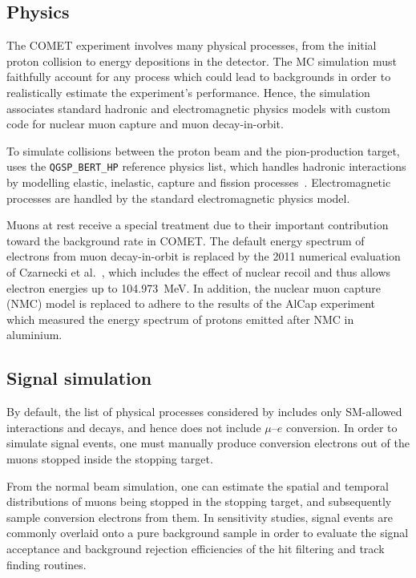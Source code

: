 
\subsection{Physics}
The COMET experiment involves many physical processes, from the initial proton
collision to energy depositions in the detector. The MC simulation must
faithfully account for any process which could lead to backgrounds in order to
realistically estimate the experiment's performance. Hence, the \SimG simulation
associates standard \Geant hadronic and electromagnetic physics models with
custom code for nuclear muon capture and muon decay-in-orbit.

To simulate collisions between the proton beam and the pion-production target,
\SimG uses the \texttt{QGSP\_BERT\_HP} reference physics list, which handles
hadronic interactions by modelling elastic, inelastic, capture and fission
processes~\cite{APOSTOLAKIS2009859}. Electromagnetic processes are handled by
the standard \Geant electromagnetic physics model.

Muons at rest receive a special treatment due to their important contribution
toward the background rate in COMET. The default energy spectrum of electrons
from muon decay-in-orbit is replaced by the 2011 numerical evaluation of
Czarnecki et al.~\cite{czarnecki}, which includes the effect of nuclear recoil
and thus allows electron energies up to \SI{104.973}{\MeV}. In addition, the
nuclear muon capture (NMC) model is replaced to adhere to the results of the
AlCap experiment~\cite{PhysRevC.105.035501} which measured the energy spectrum
of protons emitted after NMC in aluminium.




\subsection{Signal simulation}
By default, the list of physical processes considered by \SimG includes only
SM-allowed interactions and decays, and hence does not include $\mu$--$e$
conversion. In order to simulate signal events, one must manually produce
conversion electrons out of the muons stopped inside the stopping target.

From the normal beam simulation, one can estimate the spatial and temporal
distributions of muons being stopped in the stopping target, and subsequently
sample conversion electrons from them. In sensitivity studies, signal events are
commonly overlaid onto a pure background sample in order to evaluate the signal
acceptance and background rejection efficiencies of the hit filtering and track
finding routines.


